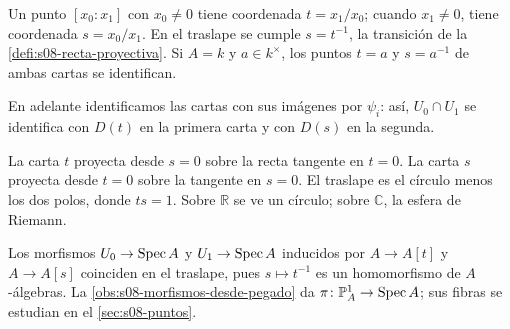 \begin{obs}[Coordenadas]
\label{obs:s08-coordenadas}
Un punto $[x_0:x_1]$ con $x_0\ne0$ tiene coordenada $t=x_1/x_0$; cuando $x_1\ne0$, tiene coordenada $s=x_0/x_1$. En el traslape se cumple $s=t^{-1}$, la transición de la \cref{defi:s08-recta-proyectiva}. Si $A=k$ y $a\in k^\times$, los puntos $t=a$ y $s=a^{-1}$ de ambas cartas se identifican.
\end{obs}

En adelante identificamos las cartas con sus imágenes por $\psi_i$: así, $U_0\cap U_1$ se identifica con $D(t)$ en la primera carta y con $D(s)$ en la segunda.

\begin{center}
\begin{minipage}{.47\textwidth}
\centering
{}
\end{minipage}\hfill
\begin{minipage}{.49\textwidth}
\small
La carta $t$ proyecta desde $s=0$ sobre la recta tangente en $t=0$. La carta $s$ proyecta desde $t=0$ sobre la tangente en $s=0$. El traslape es el círculo menos los dos polos, donde $ts=1$. Sobre $\mathbb R$ se ve un círculo; sobre $\mathbb C$, la esfera de Riemann.
\end{minipage}
\end{center}

\begin{obs}
\label{obs:s08-morfismo-estructural}
Los morfismos $U_0\to\operatorname{Spec} A$ y $U_1\to\operatorname{Spec} A$ inducidos por $A\to A[t]$ y $A\to A[s]$ coinciden en el traslape, pues $s\mapsto t^{-1}$ es un homomorfismo de $A$-álgebras. La \cref{obs:s08-morfismos-desde-pegado} da $\pi\colon \mathbb P_A^1\to\operatorname{Spec} A$; sus fibras se estudian en el \cref{sec:s08-puntos}.
\end{obs}

